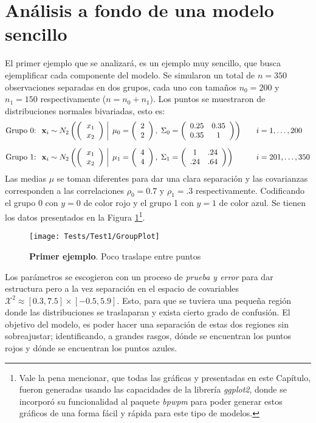 \documentclass[../Main/Main.tex]{subfiles}
\begin{document}
\section{Análisis a fondo de una modelo sencillo} \label{sec:Test1}
El primer ejemplo que se analizará, es un ejemplo muy sencillo, que busca ejemplificar cada componente del modelo. Se simularon un total de $n = 350$ observaciones separadas en dos grupos, cada uno con tamaños $n_{0} = 200$ y  $n_{1} = 150$ respectivamente ($n = n_0 + n_1$). Los puntos se muestraron de distribuciones normales bivariadas, esto es:
\begin{align*}
\text{Grupo 0: } \;
&\xsn_i \sim \normbivar{2}{2}{0.25}{0.35}{1}{0} \quad
& &i = 1,\ldots,200 \\[6pt]
\text{Grupo 1: } \;
&\xsn_i \sim \normbivar{4}{4}{1}{.24}{.64}{1} \quad
& &i = 201,\ldots,350
\end{align*}
Las medias $\mu$ se toman diferentes para dar una clara separación y las covarianzas corresponden a las correlaciones $\rho_0 = 0.7$ y $\rho_1 = .3$ respectivamente. Codificando el grupo 0 con $y = 0$ de color rojo y el grupo 1 con $y = 1$ de color azul. Se tienen los datos presentados en la Figura \ref{fig:Test1Plot}\footnote{Vale la pena mencionar, que todas las gráficas y presentadas en este Capítulo, fueron generadas usando las capacidades de la librería \textit{ggplot2}, donde se incorporó su funcionalidad al paquete \textit{bpwpm} para poder generar estos gráficos de una forma fácil y rápida para este tipo de modelos.}.
\begin{figure}[h]
  \centering
      \texttt{[image: Tests/Test1/GroupPlot]}
  \caption{\textbf{Primer ejemplo}. Poco traslape entre puntos}
 \label{fig:Test1Plot}
\end{figure}
Los parámetros se escogieron con un proceso de \textit{prueba y error} para dar estructura pero a la vez separación en el espacio de covariables $\mathcal{X}^2 \approx [0.3,7.5]\times[-0.5,5.9]$. Esto, para que se tuviera una pequeña región donde las distribuciones se traslaparan y exista cierto grado de confusión. El objetivo del modelo, es poder hacer una separación de estas dos regiones sin sobreajustar; identificando, a grandes rasgos, dónde se encuentran los puntos rojos y dónde se encuentran los puntos azules.\\
\end{document}
